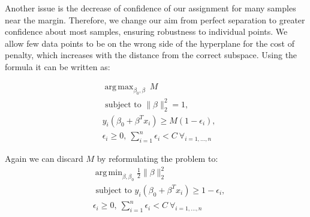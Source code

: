\documentclass[shortabstract, english, mgr]{iithesis}
\DeclareMathOperator*{\argmax}{arg\,max}
\DeclareMathOperator*{\argmin}{arg\,min}
\begin{document}
Another issue is the decrease of confidence of our assignment for many samples near the margin. Therefore, we change our aim from perfect separation to greater confidence about most samples, ensuring robustness to individual points. We allow few data points to be on the wrong side of the hyperplane for the cost of penalty, which increases with the distance from the correct subspace. Using the formula it can be written as:

\begin{align*}
&{\argmax_{\beta_{0}, \beta} \ M} \\ &{\text { subject to } \|\beta\|_2^2 = 1}, \\ &y_{i}\left(\beta_{0}+\beta^T x_i\right) \geq M(1 - \epsilon_i), \\
& \epsilon_i \geq 0, \ \sum_{i=1}^n \epsilon_i < C \ \forall_{i=1, \ldots, n}
\end{align*}

Again we can discard $M$ by reformulating the problem to:
\begin{align*}
& \argmin_{\beta, \beta_0} \frac{1}{2}\|\beta\|^2_2 \\ &{\text { subject to }} y_{i}\left(\beta_{0}+\beta^T x_i\right) \geq 1 - \epsilon_i, \\ &\epsilon_i \geq 0, \ \sum_{i=1}^n \epsilon_i < C \ \forall_{i=1, \ldots, n}
\end{align*}
\end{document}

